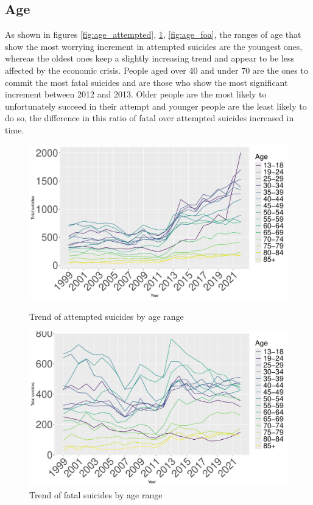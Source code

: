 \documentclass{article}
\begin{document}
\subsection{Age}
As shown in figures \ref{fig:age_attempted}, 
\ref{fig:age_fatal}, \ref{fig:age_foa},
the ranges of age that show the most worrying increment in attempted suicides 
are the youngest ones, whereas the oldest ones keep a slightly increasing trend and 
appear to be less affected by the economic crisis.
People aged over 40 and under 70 are the ones to commit the most fatal suicides and are those
who show the most significant increment between 2012 and 2013.
Older people are the most likely to unfortunately succeed in their attempt and younger people
are the least likely to do so, the difference in this ratio of fatal over attempted suicides 
increased in time.
%
\begin{figure}[H]
    \centering
    \begin{minipage}{0.65\textwidth}
        \includegraphics[width=\textwidth]{imgs/age_attempted.pdf}
        \caption{Trend of attempted suicides by age range}
	\label{fig:age_attempted}
    \end{minipage}
    \hfill
    \begin{minipage}{0.65\textwidth}
        \includegraphics[width=\textwidth]{imgs/age_fatal.pdf}
        \caption{Trend of fatal suicides by age range}
	\label{fig:age_fatal}
    \end{minipage}
\end{figure}
\end{document}
